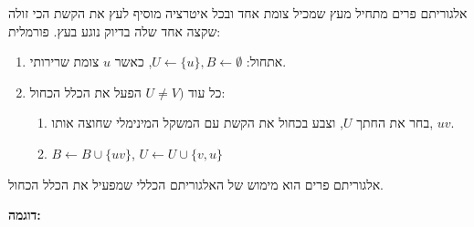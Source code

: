 אלגוריתם פרים מתחיל מעץ שמכיל צומת אחד ובכל איטרציה מוסיף לעץ את הקשת הכי זולה שקצה
אחד שלה בדיוק נוגע בעץ.
פורמלית:
\begin{enumerate}
\item
אתחול:
$U \leftarrow \{u\}, B \leftarrow \emptyset$, 
כאשר $u$ צומת שרירותי.
\item
כל עוד 
$U \neq V)$
הפעל את הכלל הכחול:
\begin{enumerate}
\item
בחר את החתך $U$, וצבע בכחול את הקשת עם המשקל המינימלי שחוצה אותו, $uv$.
\item
$B \leftarrow B \cup \{uv\}$, 
$U \leftarrow U \cup \{v, u\}$
\end{enumerate}
\end{enumerate}
\begin{observation}
אלגוריתם פרים הוא מימוש של האלגוריתם הכללי שמפעיל את הכלל הכחול.
\end{observation}



\textbf{דוגמה:}

\begin{center}
\end{center}




